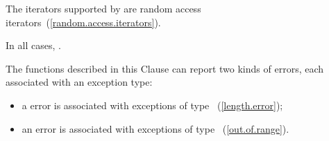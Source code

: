 \pnum
The iterators supported by
 are random access iterators~(\ref{random.access.iterators}).

\pnum
In all cases,
.

\pnum
The functions described in this Clause can report two
kinds of errors, each associated with an exception type:

\begin{itemize}
\item
a
error is associated with exceptions of type
~(\ref{length.error});
%
\item
an
error is associated with exceptions of type
~(\ref{out.of.range}).
%
\end{itemize}


